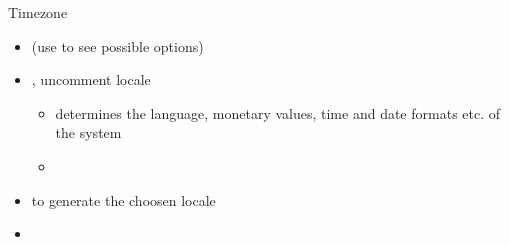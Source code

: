 \begin{frame}{Timezone\vspace{0.5cm}}
  \begin{itemize}
    \item {} (use  to see possible options)
    \item {}, uncomment locale 
      \begin{itemize}
        \item determines the language, monetary values, time and date formats etc. of the system
        \item {}
      \end{itemize}
    \item {} to generate the choosen locale
    \item {}
  \end{itemize}
\end{frame}

